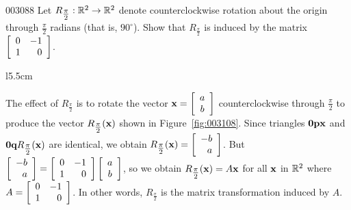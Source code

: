 \begin{example}{}{003088}
Let $R_{\tfrac{\pi}{2}} : \mathbb{R}^{2} \to \mathbb{R}^{2}$ denote counterclockwise rotation about the origin through $\frac{\pi}{2}$ radians (that is, $90^{\circ}$)\footnotemark. Show that $R_{\frac{\pi}{2}}$ is induced by the matrix $\left[ \begin{array}{rr}
 0 & -1 \\
 1 & 0
 \end{array} \right]$.


\newpage
\begin{solution}
 \begin{wrapfigure}{l}{5.5cm}
	\centering
	
	\caption{\label{fig:003108}}
\end{wrapfigure}


\setlength{\rightskip}{0pt plus 200pt} 
The effect of $R_{\frac{\pi}{2}}$ is to rotate the vector $\textbf{x} = \left[ \begin{array}{c}
 a \\
 b
 \end{array} \right]$ counterclockwise through  $\frac{\pi}{2}$ to produce the vector $R_{\tfrac{\pi}{2}}(\textbf{x})$ shown in Figure~\ref{fig:003108}. Since triangles $\textbf{0}\textbf{p}\textbf{x}$ and $\textbf{0}\textbf{q}R_{\tfrac{\pi}{2}}(\textbf{x})$ are identical, we obtain $R_{\tfrac{\pi}{2}}(\textbf{x}) = \left[ \begin{array}{r}
 -b \\
 a
 \end{array} \right]$. But $\left[ \begin{array}{r}
 -b \\
 a
 \end{array} \right] = \left[ \begin{array}{rr}
 0 & -1 \\
 1 & 0
 \end{array} \right] \left[ \begin{array}{c}
 a \\
 b
 \end{array} \right]$, so we obtain $R_{\tfrac{\pi}{2}}(\textbf{x}) = A\textbf{x}$ for all $\textbf{x}$ in $\mathbb{R}^2$ where $A = \left[ \begin{array}{rr}
0 & -1 \\
1 & 0
\end{array} \right]$. In other words, $R_{\frac{\pi}{2}}$ is the matrix transformation induced by $A$.
\vspace{1em}
\end{solution}
\end{example}

